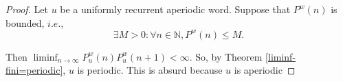 \documentclass[a4 paper,12pt]{article}
\newtheorem{theorem}{Theorem}[section]
\begin{document}
\begin{proof}

Let $u$ be a uniformly recurrent aperiodic word. Suppose that $P^w(n)$ is bounded, $i.e.$,
$$\exists M>0: \forall n\in \mathbb{N}, P^w(n)\leq M.$$

Then $\liminf_{n\rightarrow \infty} P^{w}_{u}(n) P^{w}_{u}(n+1) <\infty$. So, by Theorem \ref{liminf-fini=periodic},  $u$ is periodic. This is absurd because $u$ is aperiodic

% 
\end{proof}
%
%
%
%
% 
% 
%
%
%
%
%
%
\end{document}
